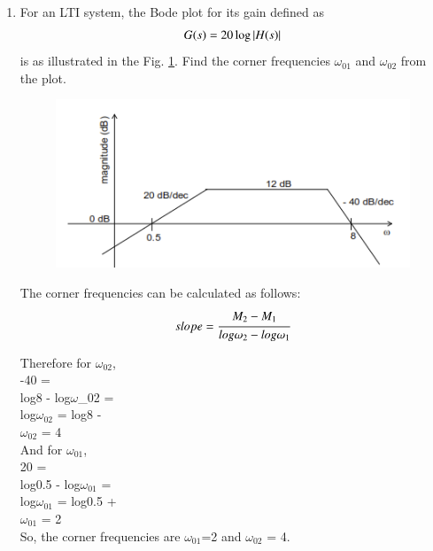 \begin{enumerate}[label=\thesection.\arabic*.,ref=\thesection.\theenumi]

\item For an LTI system, the Bode plot for its gain defined as
\begin{align}
	G(s) = 20\log\abs{H(s)}
	\label{eq:ep18btech11016_gain}
\end{align}
is as illustrated in the Fig. \ref{fig:ep18btech11016_bode}. Find the corner frequencies $\omega_{01}$ and $\omega_{02}$ from the plot.
\begin{figure}[ht!]
\centering
    \includegraphics[width=\columnwidth]{./figs/ep18btech11016_fig1.png}
    \caption{}
    \label{fig:ep18btech11016_bode}
\end{figure}

\solution
The corner frequencies can be calculated as follows:
\begin{align*}
    slope = \cfrac{M_2 - M_1}{log\omega_2 - log\omega_1}\\
\end{align*}

Therefore for $\omega_{02}$,\\
-40 = \\
log8 - log$\omega$_{02} = \\
log$\omega_{02}$ = log8 - \\
$\omega_{02}$ = 4\\

And for $\omega_{01}$,\\
20 = \\
log0.5 - log$\omega_{01}$ = \\
log$\omega_{01}$ = log0.5 + \\
$\omega_{01}$ = 2\\
So, the corner frequencies are $\omega_{01}$=2 and $\omega_{02}$ = 4.\\


\end{enumerate}

